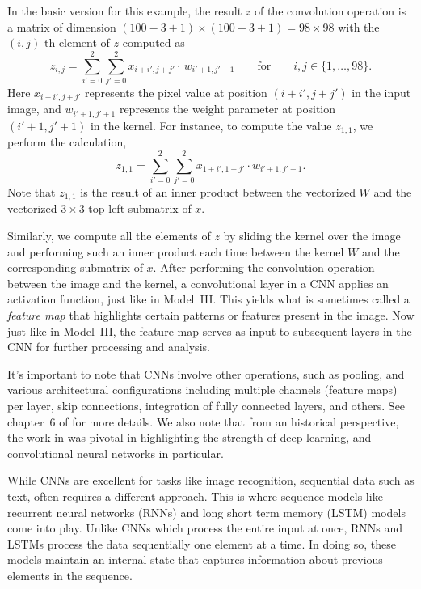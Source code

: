 \documentclass[12pt]{article}
\begin{document}
In the basic version for this example, the result $z$ of the convolution operation is a matrix of dimension $(100 - 3 + 1) \times (100 - 3 + 1) = 98 \times 98$ with the $(i, j)$-th element of $z$ computed as 
%
\begin{equation}
\label{eq:conv-explicit}
z_{i,j} = \sum_{i'=0}^{2} \sum_{j'=0}^{2} x_{i+i', j+j'}  \cdot \, w_{i'+1, j'+1}
\qquad
\textrm{for}
\qquad i, j \in \{1, \dots, 98\}.
\end{equation}
%
Here \( x_{i+i', j+j'} \) represents the pixel value at position \( (i+i', j+j') \) in the input image, and \( w_{i'+1, j'+1} \) represents the weight parameter at position \( (i'+1, j'+1) \) in the kernel. For instance, to compute the value $z_{1, 1}$,%
we perform the calculation,
%
\begin{equation}
\label{eq:very-spcific-conv}
z_{1,1} = \sum_{i'=0}^{2} \sum_{j'=0}^{2} x_{1+i', 1+j'} \cdot w_{i'+1, j'+1}.
\end{equation}
%
Note that $z_{1,1}$ is the result of an inner product between the vectorized $W$ and the vectorized $3\times 3$ top-left submatrix of $x$. 

Similarly, we compute all the elements of $z$ by sliding the kernel over the image and performing such an inner product each time between the kernel $W$ and the corresponding submatrix of $x$. After performing the convolution operation between the image and the kernel, a convolutional layer in a CNN applies an activation function, just like in Model~III. This yields what is sometimes called a {\em feature map} that highlights certain patterns or features present in the image. Now just like in Model~III, the feature map serves as input to subsequent layers in the CNN for further processing and analysis.

It's important to note that CNNs involve other operations, such as pooling, and various architectural configurations including multiple channels (feature maps) per layer, skip connections, integration of fully connected layers, and others. See chapter~6 of \cite{LiquetMokaNazarathy2024DeepLearning} for more details. We also note that from an historical perspective, the work in \cite{krizhevsky2012imagenetxxxqqq} was pivotal in highlighting the strength of deep learning, and convolutional neural networks in particular.

While CNNs are excellent for tasks like image recognition, sequential data such as text, often requires a different approach. This is where sequence models like recurrent neural networks (RNNs) and long short term memory (LSTM) models come into play. Unlike CNNs which process the entire input at once, RNNs and LSTMs process the data sequentially one element at a time. In doing so, these models maintain an internal state that captures information about previous elements in the sequence.
\end{document}
